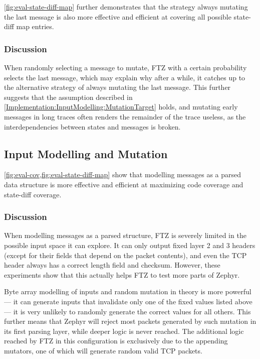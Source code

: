 \documentclass[twocolumn]{article}
\newcommand{\proj}{FTZ\xspace}
\begin{document}
\cref{fig:eval-state-diff-map} further demonstrates that the strategy always mutating the last message is also more effective and efficient at covering all possible state-diff map entries.

\subsubsection*{Discussion}

When randomly selecting a message to mutate, \proj with a certain probability selects the last message, which may explain why after a while, it catches up to the alternative strategy of always mutating the last message. This further suggests that the assumption described in \cref{Implementation:InputModelling:MutationTarget} holds, and mutating early messages in long traces often renders the remainder of the trace useless, as the interdependencies between states and messages is broken.

\subsection{Input Modelling and Mutation}

\cref{fig:eval-cov,fig:eval-state-diff-map} show that modelling messages as a parsed data structure is more effective and efficient at maximizing code coverage and state-diff coverage.

\subsubsection*{Discussion}

When modelling messages as a parsed structure, \proj is severely limited in the possible input space it can explore. It can only output fixed layer 2 and 3 headers (except for their fields that depend on the packet contents), and even the TCP header always has a correct length field and checksum. However, these experiments show that this actually helps \proj to test more parts of Zephyr.

Byte array modelling of inputs and random mutation in theory is more powerful — it can generate inputs that invalidate only one of the fixed values listed above — it is very unlikely to randomly generate the correct values for all others. This further means that Zephyr will reject most packets generated by such mutation in its first parsing layer, while deeper logic is never reached. The additional logic reached by \proj in this configuration is exclusively due to the appending mutators, one of which will generate random valid TCP packets.
\end{document}
